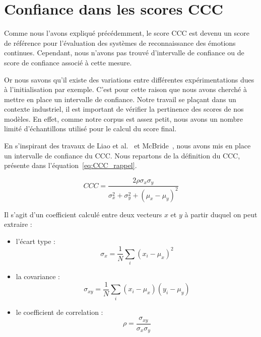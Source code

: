 \section{Confiance dans les scores CCC}
Comme nous l'avons expliqué précédemment, le score CCC est devenu un score de référence pour l'évaluation des systèmes de reconnaissance des émotions continues. Cependant, nous n'avons pas trouvé d'intervalle de confiance ou de score de confiance associé à cette mesure.

Or nous savons qu'il existe des variations entre différentes expérimentations dues à l'initialisation par exemple. C'est pour cette raison que nous avons cherché à mettre en place un intervalle de confiance. Notre travail se plaçant dans un contexte industriel, il est important de vérifier la pertinence des scores de nos modèles. En effet, comme notre corpus est assez petit, nous avons un nombre limité d'échantillons utilisé pour le calcul du score final.

En s'inspirant des travaux de Liao et al.~\cite{Liao2000} et McBride~\cite{McBride2005}, nous avons mis en place un intervalle de confiance du CCC. Nous repartons de la définition du CCC, présente dans l'équation~\ref{eq:CCC_rappel}.

\begin{equation}
   CCC = \frac{2\rho\sigma_x\sigma_y}{\sigma_x^2 + \sigma_y^2 + (\mu_x - \mu_y)^2}
\label{eq:CCC_rappel}
\end{equation}

Il s'agit d'un coefficient calculé entre deux vecteurs $x$ et $y$ à partir duquel on peut extraire :

\begin{itemize}
  \item l'écart type :
  \begin{equation}
      \sigma_x = \dfrac{1}{N} \sum_{i} \left(x_i - \mu_x\right)^2
  \end{equation}

  \item la covariance :
  \begin{equation}
    \sigma_{xy} = \dfrac{1}{N} \sum_{i} \left(x_i - \mu_x\right)\left(y_i - \mu_y\right)
  \end{equation}

  \item le coefficient de correlation :
  \begin{equation}
    \rho = \dfrac{\sigma_{xy}}{\sigma_{x} \sigma_{y} }
  \end{equation}
\end{itemize}

